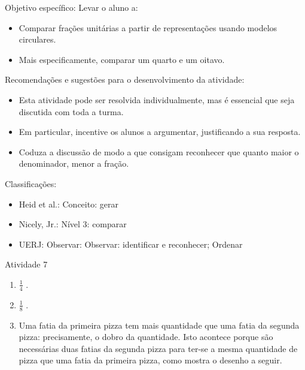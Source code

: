 \documentclass[oneside]{book}
\begin{document}
\begin{multicols}{2}
  Objetivo específico: Levar o aluno a:
\begin{itemize} %
    \item       Comparar frações unitárias a partir de representações usando modelos circulares.
    \item       Mais especificamente, comparar um quarto e um oitavo.
\end{itemize} %


  Recomendações e sugestões para o desenvolvimento da atividade:
\begin{itemize} %
    \item       Esta atividade pode ser resolvida individualmente, mas é essencial que seja discutida com toda a turma.
    \item       Em particular, incentive os alunos a argumentar, justificando a sua resposta.
    \item       Coduza a discussão de modo a que consigam reconhecer que quanto maior o denominador, menor a fração.
\end{itemize} %


  Classificações:
\begin{itemize} %
    \item       Heid et al.: Conceito: gerar
    \item       Nicely, Jr.: Nível 3: comparar
    \item       UERJ: Observar: Observar: identificar e reconhecer; Ordenar
\end{itemize} %



\begin{resposta*}{Atividade 7}
\begin{enumerate} [\quad a)] %
    \item             $\frac{1}{4}$      .
    \item             $\frac{1}{8}$      .
    \item       Uma fatia da primeira pizza tem mais quantidade que uma fatia da segunda pizza: precisamente, o dobro da quantidade. Isto acontece porque são necessárias duas fatias da segunda pizza para ter-se a mesma quantidade de pizza que uma fatia da primeira pizza, como mostra o desenho a seguir.
\end{enumerate} %
\begin{center}
        \quad \quad
\end{center}
\end{resposta*}






\end{multicols}
\end{document}
